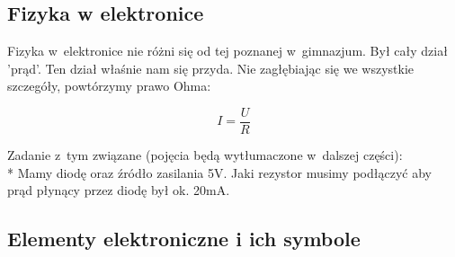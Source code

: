 \documentclass[a4paper,12pt, twoside]{article}
\begin{document}
 \subsection{Fizyka w elektronice}
	Fizyka w~elektronice nie różni się od tej poznanej w~gimnazjum. Był cały dział 'prąd'. Ten dział właśnie nam się przyda. Nie zagłębiając się we wszystkie szczegóły, powtórzymy prawo Ohma:
	\begin{center}
	\[
	I=\frac{U}{R}
	\]	
	\end{center}
Zadanie z~tym związane (pojęcia będą wytłumaczone w~dalszej części): \\* Mamy diodę oraz źródło zasilania 5V. Jaki rezystor musimy podłączyć aby prąd płynący przez diodę był ok. 20mA. %
	\subsection{Elementy elektroniczne i ich symbole}
\end{document}
